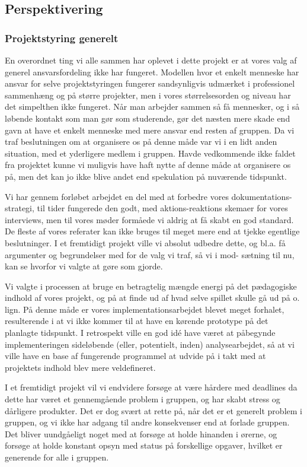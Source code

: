 \documentclass[10pt,a4paper,danish]{article}
\begin{document}
\subsection{Perspektivering}
\subsubsection{Projektstyring generelt}
En overordnet ting vi alle sammen har oplevet i dette projekt er at vores valg
af generel ansvarsfordeling ikke har fungeret. Modellen hvor et enkelt menneske
har ansvar for selve projektstyringen fungerer sandsynligvis udmærket i professionel
sammenhæng og på større projekter, men i vores størrelsesorden og niveau har det
simpelthen ikke fungeret. Når man arbejder sammen så få mennesker, og i så løbende 
kontakt som man gør som studerende, gør det næsten mere skade end gavn at have et 
enkelt menneske med mere ansvar end resten af gruppen. Da vi traf beslutningen om 
at organisere os på denne måde var vi i en lidt anden situation, med et yderligere 
medlem i gruppen. Havde vedkommende ikke faldet fra projektet kunne vi muligvis
have haft nytte af denne måde at organisere os på, men det kan jo ikke blive andet
end spekulation på nuværende tidspunkt. 

Vi har gennem forløbet arbejdet en del med at forbedre vores dokumentations-
strategi, til tider fungerede den godt, med aktions-reaktions skemaer for vores
interviews, men til vores møder formåede vi aldrig at få skabt en god standard.
De fleste af vores referater kan ikke bruges til meget mere end at tjekke
egentlige beslutninger. I et fremtidigt projekt ville vi absolut udbedre dette,
og bl.a. få argumenter og begrundelser med for de valg vi traf, så vi i mod-
sætning til nu, kan se hvorfor vi valgte at gøre som gjorde.

Vi valgte i processen at bruge en betragtelig mængde energi på det pædagogiske indhold
af vores projekt, og på at finde ud af hvad selve spillet skulle gå ud på o. lign. På 
denne måde er vores implementationsarbejdet blevet meget forhalet, resulterende i at
vi ikke kommer til at have en kørende prototype på det planlagte tidspunkt. I retrospekt
ville en god idé have været at påbegynde implementeringen sideløbende (eller, potentielt, 
inden) analysearbejdet, så at vi ville have en base af fungerende programmel at udvide
på i takt med at projektets indhold blev mere veldefineret.

I et fremtidigt projekt vil vi endvidere forsøge at være hårdere med deadlines da dette har
været et gennemgående problem i gruppen, og har skabt stress og dårligere
produkter. Det er dog svært at rette på, når det er et generelt problem i
gruppen, og vi ikke har adgang til andre konsekvenser end at forlade gruppen.
Det bliver uundgåeligt noget med at forsøge at holde hinanden i ørerne, og
forsøge at holde konstant opsyn med status på forskellige opgaver, hvilket er
generende for alle i gruppen. 
\end{document}
